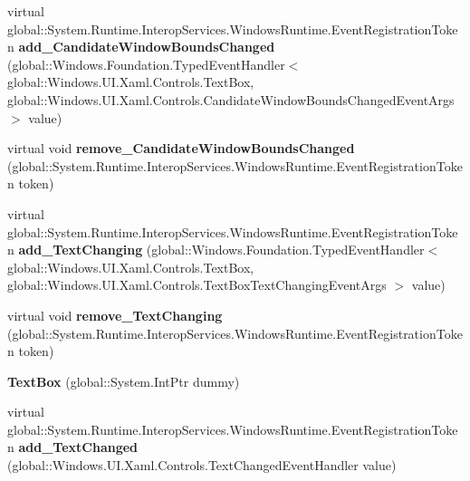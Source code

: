 \begin{DoxyCompactItemize}
virtual global\+::\+System.\+Runtime.\+Interop\+Services.\+Windows\+Runtime.\+Event\+Registration\+Token {\bfseries add\+\_\+\+Candidate\+Window\+Bounds\+Changed} (global\+::\+Windows.\+Foundation.\+Typed\+Event\+Handler$<$ global\+::\+Windows.\+U\+I.\+Xaml.\+Controls.\+Text\+Box, global\+::\+Windows.\+U\+I.\+Xaml.\+Controls.\+Candidate\+Window\+Bounds\+Changed\+Event\+Args $>$ value)
\item 
\mbox{\label{class_windows_1_1_u_i_1_1_xaml_1_1_controls_1_1_text_box_a69264830074f27caa404569cb91f24af}} 
virtual void {\bfseries remove\+\_\+\+Candidate\+Window\+Bounds\+Changed} (global\+::\+System.\+Runtime.\+Interop\+Services.\+Windows\+Runtime.\+Event\+Registration\+Token token)
\item 
\mbox{\label{class_windows_1_1_u_i_1_1_xaml_1_1_controls_1_1_text_box_acb77f51967d36ae23348c70a69fb0313}} 
virtual global\+::\+System.\+Runtime.\+Interop\+Services.\+Windows\+Runtime.\+Event\+Registration\+Token {\bfseries add\+\_\+\+Text\+Changing} (global\+::\+Windows.\+Foundation.\+Typed\+Event\+Handler$<$ global\+::\+Windows.\+U\+I.\+Xaml.\+Controls.\+Text\+Box, global\+::\+Windows.\+U\+I.\+Xaml.\+Controls.\+Text\+Box\+Text\+Changing\+Event\+Args $>$ value)
\item 
\mbox{\label{class_windows_1_1_u_i_1_1_xaml_1_1_controls_1_1_text_box_aacef19be208dde1a5d0585bc1113f0bd}} 
virtual void {\bfseries remove\+\_\+\+Text\+Changing} (global\+::\+System.\+Runtime.\+Interop\+Services.\+Windows\+Runtime.\+Event\+Registration\+Token token)
\item 
\mbox{\label{class_windows_1_1_u_i_1_1_xaml_1_1_controls_1_1_text_box_adcfa94babf525333e555cfc9f2b34314}} 
{\bfseries Text\+Box} (global\+::\+System.\+Int\+Ptr dummy)
\item 
\mbox{\label{class_windows_1_1_u_i_1_1_xaml_1_1_controls_1_1_text_box_a206b2889087ba0dbfe818431045788ff}} 
virtual global\+::\+System.\+Runtime.\+Interop\+Services.\+Windows\+Runtime.\+Event\+Registration\+Token {\bfseries add\+\_\+\+Text\+Changed} (global\+::\+Windows.\+U\+I.\+Xaml.\+Controls.\+Text\+Changed\+Event\+Handler value)

\end{DoxyCompactItemize}
